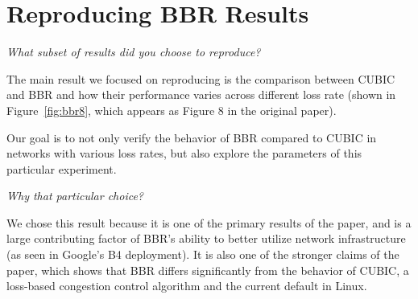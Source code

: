 
\section{Reproducing BBR Results}

\emph{What subset of results did you choose to reproduce?}

The main result we focused on reproducing is the comparison between
CUBIC and BBR and how their performance varies across different loss
rate (shown in Figure~\ref{fig:bbr8}, which appears as Figure 8 in the
original paper).

Our goal is to not only verify the behavior of BBR compared to CUBIC in
networks with various loss rates, but also explore the parameters of this
particular experiment.

\emph{Why that particular choice?}

We chose this result because it is one of the primary results of the paper,
and is a large contributing factor of BBR's ability to better utilize
network infrastructure (as seen in Google's B4 deployment). It is also one
of the stronger claims of the paper, which shows that BBR differs significantly
from the behavior of CUBIC, a loss-based congestion control algorithm and the
current default in Linux.
